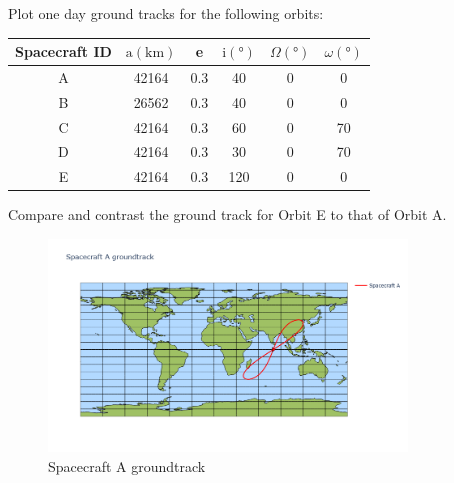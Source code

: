 \begin{hwkProblem}{2}{}

	Plot one day ground tracks for the following orbits:
	\begin{center}
		\begin{tabular}{cccccc}
			\hline Spacecraft ID & \( \mathrm{a}(\unit{\km}) \) & e   & \( \mathrm{i}(\unit{\degree}) \) & \( \Omega(\unit{\degree}) \) & \( \omega(\unit{\degree}) \) \\
			\hline
			A                    & 42164                        & 0.3 & 40                               & 0                            & 0                            \\
			B                    & 26562                        & 0.3 & 40                               & 0                            & 0                            \\
			C                    & 42164                        & 0.3 & 60                               & 0                            & 70                           \\
			D                    & 42164                        & 0.3 & 30                               & 0                            & 70                           \\
			E                    & 42164                        & 0.3 & 120                              & 0                            & 0                            \\
			\hline
		\end{tabular}
	\end{center}
	Compare and contrast the ground track for Orbit E to that of Orbit A.

	\hwkSol
	
	

	\hwkPart

	\begin{figure}[H]
		\begin{center}
			\includegraphics[width=0.85\textwidth]{./images/s02a.png}
		\end{center}
		\caption{Spacecraft A groundtrack}\label{fig:s02a}
	\end{figure}


\end{hwkProblem}

